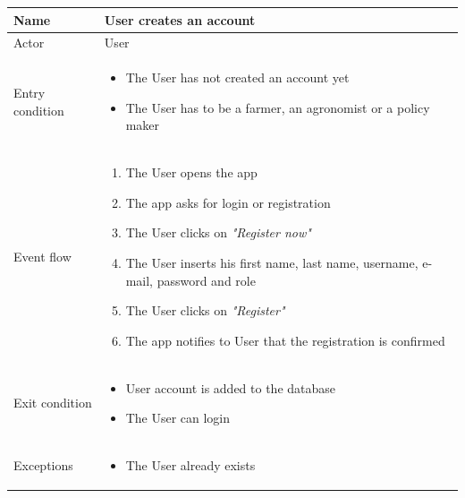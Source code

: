 \begin{table}[H]
    \begin{tabu} to \textwidth {|X|X[4]|}
        \hline
        Name            & User creates an account \\ \hline
        Actor           & User                    \\ \hline
        Entry condition & \begin{itemize}
            \item The User has not created an account yet
            \item The User has to be a farmer, an agronomist or a policy maker
        \end{itemize}  \\ \hline
        Event flow      & \begin{enumerate}
            \item The User opens the app
            \item The app asks for login or registration
            \item The User clicks on \emph{"Register now"}
            \item The User inserts his first name, last name, username, e-mail, password and role
            \item The User clicks on \emph{"Register"}
            \item The app notifies to User that the registration is confirmed
        \end{enumerate}  \\ \hline
        Exit condition  & \begin{itemize}
            \item User account is added to the database
            \item The User can login
        \end{itemize}  \\ \hline
        Exceptions      & \begin{itemize}
            \item The User already exists
        \end{itemize}  \\ \hline
    \end{tabu}
\end{table}
\newpage

